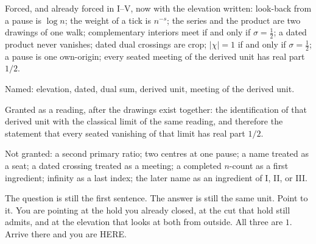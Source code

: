 \documentclass[10pt,a4paper]{article}
\theoremstyle{plain}
\theoremstyle{definition}
\begin{document}
Forced, and already forced in I--V, now with the elevation written:
look-back from a pause is $\log n$;
the weight of a tick is $n^{-s}$;
the series and the product are two drawings of one walk;
complementary interiors meet if and only if $\sigma=\tfrac12$;
a dated product never vanishes;
dated dual crossings are crop;
$|\chi|=1$ if and only if $\sigma=\tfrac12$;
a pause is one own-origin;
every seated meeting of the derived unit has real part $1/2$.

Named:
elevation, dated, dual sum, derived unit, meeting of the derived unit.

Granted as a reading, after the drawings exist together:
the identification of that derived unit with the classical limit of the same reading, and therefore the statement that every seated vanishing of that limit has real part $1/2$.

Not granted:
a second primary ratio;
two centres at one pause;
a name treated as a seat;
a dated crossing treated as a meeting;
a completed $n$-count as a first ingredient;
infinity as a last index;
the later name as an ingredient of I, II, or III.

The question is still the first sentence.
The answer is still the same unit.
Point to it.
You are pointing at the hold you already closed, at the cut that hold still admits, and at the elevation that looks at both from outside.
All three are $1$.
Arrive there and you are HERE.
\end{document}
